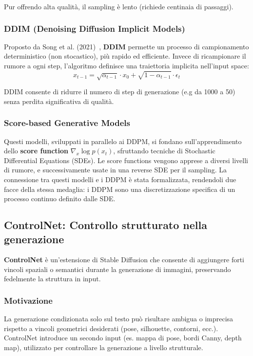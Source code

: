 Pur offrendo alta qualità, il sampling è lento (richiede centinaia di passaggi).

\subsubsection*{DDIM (Denoising Diffusion Implicit Models)}

Proposto da Song et al. (2021)~\cite{song2021score}, \textbf{DDIM} permette un processo di campionamento deterministico (non stocastico), più rapido ed efficiente. Invece di ricampionare il rumore a ogni step, l'algoritmo definisce una traiettoria implicita nell’input space:
\begin{equation}
    x_{t-1} = \sqrt{\alpha_{t-1}}\cdot x_0 + \sqrt{1-\alpha_{t-1}}\cdot\epsilon_t
\end{equation}

DDIM consente di ridurre il numero di step di generazione (e.g da 1000 a 50) senza perdita significativa di qualità.

\subsubsection*{Score-based Generative Models}

Questi modelli, sviluppati in parallelo ai DDPM, si fondano sull’apprendimento dello \textbf{score function} $\nabla_{x} \log p(x_t)$, sfruttando tecniche di Stochastic Differential Equations (SDEs). Le score functions vengono apprese a diversi livelli di rumore, e successivamente usate in una reverse SDE per il sampling. La connessione tra questi modelli e i DDPM è stata formalizzata, rendendoli due facce della stessa medaglia: i DDPM sono una discretizzazione specifica di un processo continuo definito dalle SDE.

\subsection*{ControlNet: Controllo strutturato nella generazione}

\textbf{ControlNet} è un'estensione di Stable Diffusion che consente di aggiungere forti vincoli spaziali o semantici durante la generazione di immagini, preservando fedelmente la struttura in input.

\subsubsection*{Motivazione}

La generazione condizionata solo sul testo può risultare ambigua o imprecisa rispetto a vincoli geometrici desiderati (pose, silhouette, contorni, ecc.). ControlNet introduce un secondo input (es. mappa di pose, bordi Canny, depth map), utilizzato per controllare la generazione a livello strutturale.

